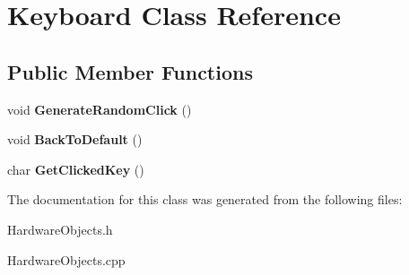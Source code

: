 \hypertarget{classKeyboard}{}\section{Keyboard Class Reference}
\label{classKeyboard}
\subsection*{Public Member Functions}
\begin{DoxyCompactItemize}
\item 
\mbox{\label{classKeyboard_a476c0abf59b76ec5ab44102ee24f38ae}} 
void {\bfseries Generate\+Random\+Click} ()
\item 
\mbox{\label{classKeyboard_aa2c5650fe2599a2418a369c5d9ddab9b}} 
void {\bfseries Back\+To\+Default} ()
\item 
\mbox{\label{classKeyboard_a0814ccde48eea424e96d0595b3ef2af1}} 
char {\bfseries Get\+Clicked\+Key} ()
\end{DoxyCompactItemize}


The documentation for this class was generated from the following files\+:\begin{DoxyCompactItemize}
\item 
Hardware\+Objects.\+h\item 
Hardware\+Objects.\+cpp\end{DoxyCompactItemize}
